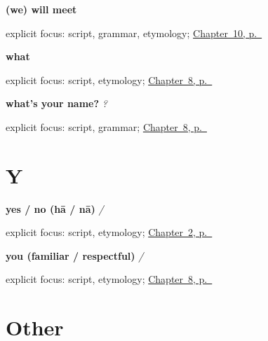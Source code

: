 \noindent\begin{minipage}[t]{\linewidth}
\raggedright
\textbf{(we) will meet}\enspace\emph{}\par
\footnotesize explicit focus: script, grammar, etymology; \hyperref[ch:farewells]{Chapter~10, p.~\pageref*{ch:farewells}}
\end{minipage}\par\smallskip

\noindent\begin{minipage}[t]{\linewidth}
\raggedright
\textbf{what}\enspace\emph{}\par
\footnotesize explicit focus: script, etymology; \hyperref[ch:introductions]{Chapter~8, p.~\pageref*{ch:introductions}}
\end{minipage}\par\smallskip

\noindent\begin{minipage}[t]{\linewidth}
\raggedright
\textbf{what's your name?}\enspace\emph{   ?}\par
\footnotesize explicit focus: script, grammar; \hyperref[ch:introductions]{Chapter~8, p.~\pageref*{ch:introductions}}
\end{minipage}\par\smallskip

\section*{Y}

\noindent\begin{minipage}[t]{\linewidth}
\raggedright
\textbf{yes / no (hā / nā)}\enspace\emph{ / }\par
\footnotesize explicit focus: script, etymology; \hyperref[ch:greetings]{Chapter~2, p.~\pageref*{ch:greetings}}
\end{minipage}\par\smallskip

\noindent\begin{minipage}[t]{\linewidth}
\raggedright
\textbf{you (familiar / respectful)}\enspace\emph{ / }\par
\footnotesize explicit focus: script, etymology; \hyperref[ch:introductions]{Chapter~8, p.~\pageref*{ch:introductions}}
\end{minipage}\par\smallskip

\section*{Other}

